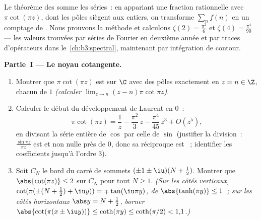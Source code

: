 \begin{problem}\label{pb:b3:residues:1}
Le théorème des  somme les séries~: en appariant une
fraction rationnelle avec $\pi\cot(\pi z)$, dont les pôles
siègent aux entiers, on transforme $\sum_{n}f(n)$ en un
comptage de . Nous prouvons la méthode et calculons
$\zeta(2) = \frac{\pi^2}{6}$ et $\zeta(4) =
\frac{\pi^4}{90}$ --- les valeurs trouvées par séries de
Fourier en deuxième année et par traces d'opérateurs dans
le~\cref{ch:b3:spectral}, maintenant par intégration de
contour.

\medskip
\noindent\textbf{Partie~I --- Le noyau cotangente.}
\begin{enumerate}
  \item Montrer que $\pi\cot(\pi z)$ est  sur $\C$
        avec des pôles  exactement en $z = n \in \Z$,
        chacun de  $1$ \emph{(calculer $\lim_{z\to
        n}(z-n)\pi\cot\pi z$)}.
  \item Calculer le début du développement de Laurent en
        $0$~:
        \[
        \pi\cot(\pi z) = \frac1z - \frac{\pi^2}{3}\,z -
        \frac{\pi^4}{45}\,z^3 + O(z^5) ,
        \]
        en divisant la série entière de $\cos$ par celle de
        $\sin$ (justifier la division~: $\frac{\sin\pi z}{\pi
        z}$ est  et non nulle près de $0$, donc sa
        réciproque est ~; identifier les
        coefficients jusqu'à l'ordre $3$).
  \item Soit $C_N$ le bord du carré de sommets
        $(\pm1\pm\iu)(N + \frac12)$. Montrer que
        $\abs{\cot(\pi z)} \leq 2$ sur $C_N$ pour tout $N
        \geq 1$. \emph{(Sur les côtés verticaux,
        $\cot(\pi(\pm(N + \frac12) + \iu y)) =
        \mp\tan(\iu\pi y)$, de  $\abs{\tanh(\pi y)}
        \leq 1$~; sur les côtés horizontaux $\abs y = N +
        \frac12$, borner $\abs{\cot(\pi(x\pm\iu y))} \leq
        \coth(\pi y) \leq \coth(\pi/2) < 1{,}1$.)}
\end{enumerate}


\end{problem}
